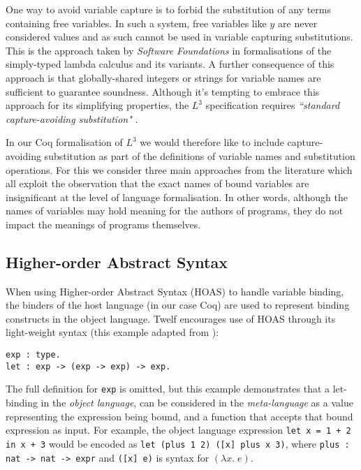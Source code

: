 \documentclass[]{unswthesis}
\let\c\texttt
\let\i\textit
\begin{document}
One way to avoid variable capture is to forbid the substitution of any terms containing free variables. In such a system, free variables like $y$ are never considered values and as such cannot be used in variable capturing substitutions. This is the approach taken by \i{Software Foundations} \cite{pierce15} in formalisations of the simply-typed lambda calculus and its variants. A further consequence of this approach is that globally-shared integers or strings for variable names are sufficient to guarantee soundness. Although it's tempting to embrace this approach for its simplifying properties, the $L^3$ specification requires \i{``standard capture-avoiding substitution"} \cite{ahmed05}.


In our Coq formalisation of $L^3$ we would therefore like to include capture-avoiding substitution as part of the definitions of variable names and substitution operations. For this we consider three main approaches from the literature which all exploit the observation that the exact names of bound variables are insignificant at the level of language formalisation. In other words, although the names of variables may hold meaning for the authors of programs, they do not impact the meanings of programs themselves.

\subsection{Higher-order Abstract Syntax}

When using Higher-order Abstract Syntax (HOAS) to handle variable binding, the binders of the host language (in our case Coq) are used to represent binding constructs in the object language. Twelf encourages use of HOAS through its light-weight syntax (this example adapted from \cite{twelf08}):

\begin{verbatim}
exp : type.
let : exp -> (exp -> exp) -> exp.
\end{verbatim}

The full definition for \c{exp} is omitted, but this example demonstrates that a let-binding in the \i{object language}, can be considered in the \i{meta-language} as a value representing the expression being bound, and a function that accepts that bound expression as input. For example, the object language expression \c{let x = 1 + 2 in x + 3} would be encoded as \c{let (plus 1 2) ([x] plus x 3)}, where \c{plus : nat -> nat -> expr} and \c{([x] e)} is syntax for $(\lambda x. \; e)$.
\end{document}
